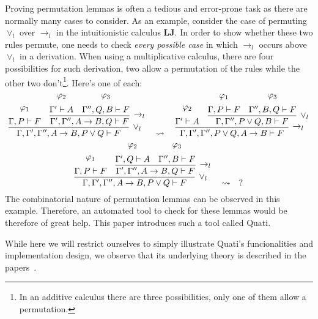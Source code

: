 \documentclass{llncs}
\begin{document}
Proving permutation lemmas is often a tedious and error-prone task as there are normally many 
cases to consider. As an example, consider the case of permuting $\vee_l$ over $\rightarrow_l$ in
the intuitionistic calculus \textbf{LJ}. In order to show whether these two
rules permute, one needs to check \emph{every possible case} in which
$\rightarrow_l$ occurs above $\vee_l$ in a derivation. When using a
multiplicative calculus, there are four possibilities for such derivation, two
allow a permutation of the rules while the other two don't\footnote{In an
additive calculus there are three possibilities, only one of them allow a
permutation.}. Here's one of each:
{\scriptsize
\[
\infer[\vee_l]{\Gamma, \Gamma', \Gamma'', A \rightarrow B , P \vee Q \vdash F}{
  \deduce{\Gamma, P \vdash F}{\varphi_1\vspace{0.2cm}}
  &
  \infer[\rightarrow_l]{\Gamma', \Gamma'', A \rightarrow B , Q \vdash F}{
    \deduce{\Gamma' \vdash A}{\varphi_2\vspace{0.2cm}}
    &
    \deduce{\Gamma'', Q, B \vdash F}{\varphi_3\vspace{0.2cm}}
  }
}
\quad\rightsquigarrow\quad
\infer[\rightarrow_l]{\Gamma, \Gamma', \Gamma'', P \vee Q, A \rightarrow B
\vdash F}{
  \deduce{\Gamma' \vdash A}{\varphi_2\vspace{0.2cm}}
  &
  \infer[\vee_l]{\Gamma, \Gamma'', P \vee Q, B \vdash F}{
    \deduce{\Gamma, P \vdash F}{\varphi_1\vspace{0.2cm}}
    &
    \deduce{\Gamma'', B, Q \vdash F}{\varphi_3\vspace{0.2cm}}
  }
}
\]
}
{\scriptsize
\[
\infer[\vee_l]{\Gamma, \Gamma', \Gamma'', A \rightarrow B , P \vee Q \vdash F}{
  \deduce{\Gamma, P \vdash F}{\varphi_1\vspace{0.2cm}}
  &
  \infer[\rightarrow_l]{\Gamma', \Gamma'', A \rightarrow B , Q \vdash F}{
    \deduce{\Gamma', Q \vdash A}{\varphi_2\vspace{0.2cm}}
    &
    \deduce{\Gamma'', B \vdash F}{\varphi_3\vspace{0.2cm}}
  }
}
\quad\rightsquigarrow\quad
?
\]
}%
The combinatorial nature of permutation lemmas can be observed in this example.
Therefore, an automated tool to check for these lemmas
would be therefore of great help. This paper introduces such a tool called Quati.

While here we will restrict ourselves to simply illustrate Quati's funcionalities and implementation design, 
we observe that its underlying theory is described in the papers~\cite{nigam.jlc,nigam13iclp,nigam14ebl}. 
 
\end{document}
